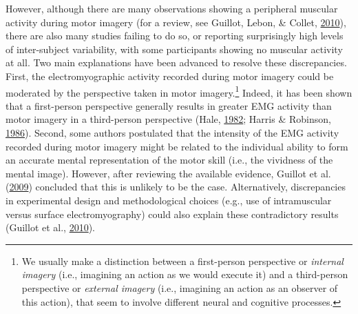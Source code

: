 \documentclass[a4paper,12pt,twoside,openright,oldfontcommands]{memoir}
\let\rmarkdownfootnote\footnote%
\def\footnote{\protect\rmarkdownfootnote}
\begin{document}
However, although there are many observations showing a peripheral muscular activity during motor imagery (for a review, see Guillot, Lebon, \& Collet, \protect\hyperlink{ref-guillot_electromyographic_2010}{2010}), there are also many studies failing to do so, or reporting surprisingly high levels of inter-subject variability, with some participants showing no muscular activity at all. Two main explanations have been advanced to resolve these discrepancies. First, the electromyographic activity recorded during motor imagery could be moderated by the perspective taken in motor imagery.\footnote{We usually make a distinction between a first-person perspective or \emph{internal imagery} (i.e., imagining an action as we would execute it) and a third-person perspective or \emph{external imagery} (i.e., imagining an action as an observer of this action), that seem to involve different neural and cognitive processes.} Indeed, it has been shown that a first-person perspective generally results in greater EMG activity than motor imagery in a third-person perspective (Hale, \protect\hyperlink{ref-hale_effects_1982}{1982}; Harris \& Robinson, \protect\hyperlink{ref-harris_effects_1986}{1986}). Second, some authors postulated that the intensity of the EMG activity recorded during motor imagery might be related to the individual ability to form an accurate mental representation of the motor skill (i.e., the vividness of the mental image). However, after reviewing the available evidence, Guillot et al. (\protect\hyperlink{ref-guillot_brain_2009}{2009}) concluded that this is unlikely to be the case. Alternatively, discrepancies in experimental design and methodological choices (e.g., use of intramuscular versus surface electromyography) could also explain these contradictory results (Guillot et al., \protect\hyperlink{ref-guillot_electromyographic_2010}{2010}).

\vspace{2mm}
\end{document}
